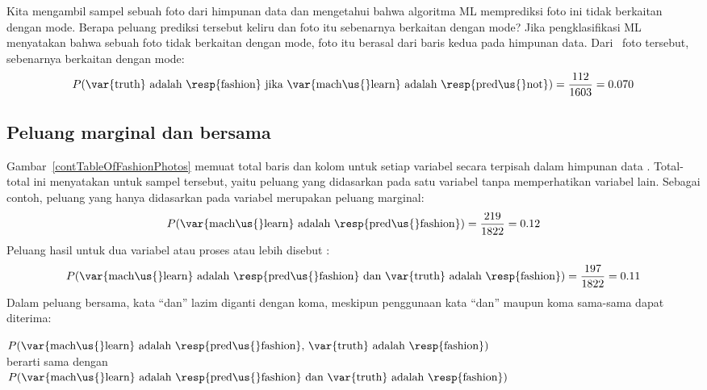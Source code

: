 \begin{examplewrap}
\begin{nexample}{Kita mengambil sampel sebuah foto dari himpunan data
    dan mengetahui bahwa algoritma ML memprediksi foto ini
    tidak berkaitan dengan mode.
    Berapa peluang prediksi tersebut keliru dan
    foto itu sebenarnya berkaitan dengan mode?}
  Jika pengklasifikasi ML menyatakan bahwa sebuah foto tidak berkaitan dengan mode,
  foto itu berasal dari baris kedua pada himpunan data.
  Dari~\fashNA{} foto tersebut, \fashNY{} sebenarnya
  berkaitan dengan mode:
\begin{align*}
P(\text{\var{truth} adalah \resp{fashion}
    jika \var{mach\us{}learn} adalah \resp{pred\us{}not}})
  = \frac{\fashNY{}}{\fashNA{}}
  = 0.070
\end{align*}
\end{nexample}
\end{examplewrap}

\subsection{Peluang marginal dan bersama}
\label{marginalAndJointProbabilities}


Gambar~\ref{contTableOfFashionPhotos} memuat total baris dan
kolom untuk setiap variabel secara terpisah dalam himpunan data
.
Total-total ini menyatakan
untuk sampel tersebut, yaitu peluang yang didasarkan pada
satu variabel tanpa memperhatikan variabel lain.
Sebagai contoh, peluang yang hanya didasarkan pada variabel
 merupakan peluang marginal:
\begin{align*}
P(\text{\var{mach\us{}learn} adalah \resp{pred\us{}fashion}})
    = \frac{\fashYA{}}{\fashN{}}
    = 0.12
\end{align*}
Peluang hasil untuk dua variabel atau proses atau lebih
disebut
:
\begin{align*}
P(\text{\var{mach\us{}learn} adalah \resp{pred\us{}fashion}
    dan \var{truth} adalah \resp{fashion}})
  = \frac{\fashYY{}}{\fashN{}}
  = 0.11
\end{align*}
Dalam peluang bersama, kata ``dan'' lazim diganti dengan koma,
meskipun penggunaan kata ``dan'' maupun koma
sama-sama dapat diterima:
\begin{center}
$P(\text{\var{mach\us{}learn} adalah \resp{pred\us{}fashion},
    \var{truth} adalah \resp{fashion}})$ \\[2mm]
berarti sama dengan \\[2mm]
$P(\text{\var{mach\us{}learn} adalah \resp{pred\us{}fashion}
    dan \var{truth} adalah \resp{fashion}})$
\end{center}

